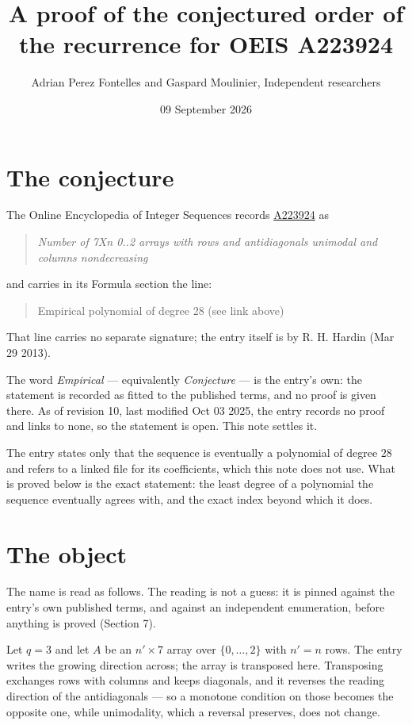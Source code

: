\documentclass[11pt]{article}
\title{A proof of the conjectured order of the recurrence for OEIS A223924}
\author{Adrian Perez Fontelles and Gaspard Moulinier, Independent researchers}
\date{09 September 2026}
\theoremstyle{definition}
\begin{document}
\maketitle
\section{The conjecture}

The Online Encyclopedia of Integer Sequences records \href{https://oeis.org/A223924}{A223924} as

\begin{quote}\itshape Number of 7Xn 0..2 arrays with rows and antidiagonals unimodal and columns nondecreasing\end{quote}

and carries in its Formula section the line:

\begin{quote}\ttfamily Empirical polynomial of degree 28 (see link above)\end{quote}

That line carries no separate signature; the entry itself is by R. H. Hardin (Mar 29 2013).

The word {\itshape Empirical} --- equivalently {\itshape Conjecture} --- is the entry's own: the statement is recorded as fitted to the published terms, and no proof is given there. As of revision 10, last modified Oct 03 2025, the entry records no proof and links to none, so the statement is open. This note settles it.

The entry states only that the sequence is eventually a polynomial of degree $28$ and refers to a linked file for its coefficients, which this note does not use. What is proved below is the exact statement: the least degree of a polynomial the sequence eventually agrees with, and the exact index beyond which it does.

\section{The object}

The name is read as follows. The reading is not a guess: it is pinned against the entry's own published terms, and against an independent enumeration, before anything is proved (Section 7).

Let $q = 3$ and let $A$ be an $n' \times 7$ array over $\{0,\dots,2\}$ with $n' = n$ rows. The entry writes the growing direction across; the array is transposed here. Transposing exchanges rows with columns and keeps diagonals, and it reverses the reading direction of the antidiagonals --- so a monotone condition on those becomes the opposite one, while unimodality, which a reversal preserves, does not change.
\end{document}
